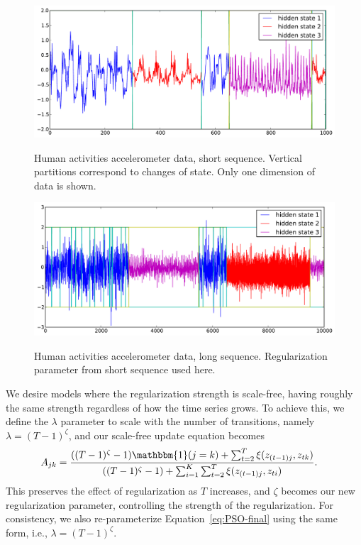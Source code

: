 \documentclass[12pt]{article}
\begin{document}
\begin{figure}[htbp]
  \caption{Human activities accelerometer data, short sequence. Vertical partitions correspond to changes of state. Only one dimension of data is shown.}
  \centering
    \includegraphics[width=0.8\linewidth]{images/MAP_results_hard_activity_short_3_states.pdf}
    \label{fig:short-real-data}
\end{figure}

\begin{figure}[htbp]
  \caption{Human activities accelerometer data, long sequence. Regularization parameter from short sequence used here.}
  \centering
    \includegraphics[width=0.8\linewidth]{images/MAP_results_hard_activity_long_3_states.pdf}
    \label{fig:long-real-data}
\end{figure}

We desire models where the regularization strength is scale-free, having roughly the same strength regardless of how the time series grows. To achieve this, we define the $\lambda$ parameter to scale with the number of transitions, namely $\lambda = (T-1)^\zeta$, and our scale-free update equation becomes
\begin{align}\label{eq:SCALE-FREE-MAP}
    A_{jk} &= \frac{((T - 1)^{\zeta}-1){\mathbbm{1}(j = k)} + \sum_{t=2}^{T} \xi(z_{(t-1)j}, z_{tk})}   
    {((T - 1)^{\zeta} - 1) + \sum_{i=1}^{K}\sum_{t=2}^{T} \xi(z_{(t-1)j}, z_{ti})}.
\end{align}
This preserves the effect of regularization as $T$ increases, and $\zeta$ becomes our new regularization parameter, controlling the strength of the regularization. For consistency, we also re-parameterize Equation~\ref{eq:PSO-final} using the same form, i.e., $\lambda = (T-1)^\zeta$.
\end{document}
